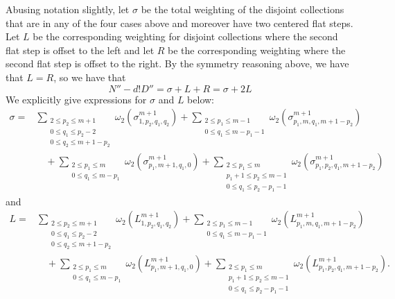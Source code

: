 \documentclass[11pt]{article}
\theoremstyle{mythm}
\begin{document}
Abusing notation slightly, let $\sigma$ be the total weighting of the disjoint collections that are in any of the four cases above and moreover have two centered flat steps. Let $L$ be the corresponding weighting for disjoint collections where the second flat step is offset to the left and let $R$ be the corresponding weighting where the second flat step is offset to the right. By the symmetry reasoning above, we have that $L=R$, so we have that
\begin{equation}\label{eqn:L=R}
N'' - d!D'' = \sigma + L + R = \sigma + 2L
\end{equation}
We explicitly give expressions for $\sigma$ and $L$ below:
\begin{equation}\label{eqn:sigma}
\begin{aligned}
\sigma = &\sum\limits_{\substack{2\leq p_2\leq m+1 \\ 0\leq q_1 \leq p_2-2 \\ 0 \leq q_2 \leq m+1-p_2}}\omega_2(\sigma_{1,p_2,q_1,q_2}^{m+1}) + \sum\limits_{\substack{2 \leq p_1 \leq m-1 \\ 0 \leq q_1 \leq m-p_1-1}}\omega_2(\sigma_{p_1,m,q_1,m+1-p_2}^{m+1}) \\
 &\quad+ \sum\limits_{\substack{2 \leq p_1 \leq m \\ 0 \leq q_1 \leq m-p_1}}\omega_2(\sigma_{p_1,m+1,q_1,0}^{m+1}) + \sum\limits_{\substack{2 \leq p_1 \leq m \\ p_1+1 \leq p_2 \leq m-1 \\ 0 \leq q_1 \leq p_2-p_1-1}} \omega_2(\sigma_{p_1,p_2,q_1,m+1-p_2}^{m+1})
\end{aligned}
\end{equation}
and
\begin{equation}\label{eqn:L}
\begin{aligned}
L = &\sum\limits_{\substack{2\leq p_2\leq m+1 \\ 0\leq q_1 \leq p_2-2 \\ 0 \leq q_2 \leq m+1-p_2}}\omega_2(L_{1,p_2,q_1,q_2}^{m+1}) + \sum\limits_{\substack{2 \leq p_1 \leq m-1 \\ 0 \leq q_1 \leq m-p_1-1}}\omega_2(L_{p_1,m,q_1,m+1-p_2}^{m+1}) \\
 &\quad+ \sum\limits_{\substack{2 \leq p_1 \leq m \\ 0 \leq q_1 \leq m-p_1}}\omega_2(L_{p_1,m+1,q_1,0}^{m+1}) + \sum\limits_{\substack{2 \leq p_1 \leq m \\ p_1+1 \leq p_2 \leq m-1 \\ 0 \leq q_1 \leq p_2-p_1-1}} \omega_2(L_{p_1,p_2,q_1,m+1-p_2}^{m+1}).
\end{aligned}
\end{equation}
\end{document}
